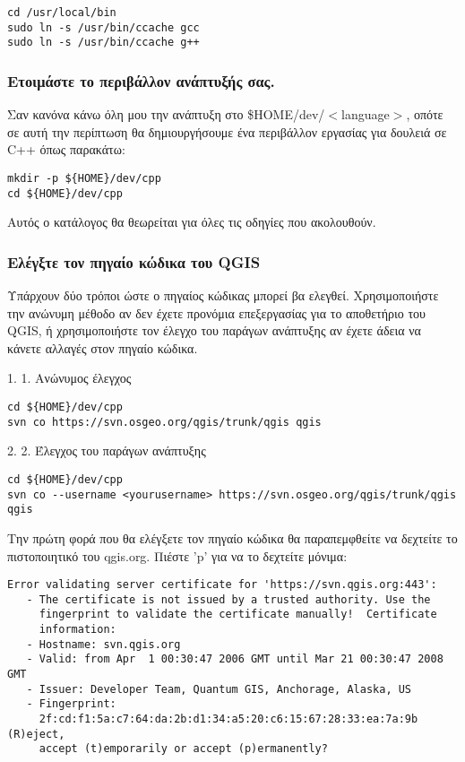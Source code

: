 \begin{verbatim}
cd /usr/local/bin 
sudo ln -s /usr/bin/ccache gcc 
sudo ln -s /usr/bin/ccache g++ 
\end{verbatim}

\hypertarget{toc8}{}
\subsubsection{Ετοιμάστε το περιβάλλον ανάπτυξής σας.}
Σαν κανόνα κάνω όλη μου την ανάπτυξη στο \$HOME/dev/$<$language$>$, οπότε σε αυτή την περίπτωση θα δημιουργήσουμε ένα περιβάλλον εργασίας για δουλειά σε C++ όπως παρακάτω: 

\begin{verbatim}
mkdir -p ${HOME}/dev/cpp 
cd ${HOME}/dev/cpp 
\end{verbatim}

Αυτός ο κατάλογος θα θεωρείται για όλες τις οδηγίες που ακολουθούν. 

\hypertarget{toc9}{}
\subsubsection{Ελέγξτε τον πηγαίο κώδικα του QGIS}
Υπάρχουν δύο τρόποι ώστε ο πηγαίος κώδικας μπορεί βα ελεγθεί. Χρησιμοποιήστε την ανώνυμη μέθοδο αν δεν έχετε προνόμια επεξεργασίας για το αποθετήριο του QGIS, ή χρησιμοποιήστε τον έλεγχο του παράγων ανάπτυξης αν έχετε άδεια να κάνετε αλλαγές στον πηγαίο κώδικα.

1. 1. Ανώνυμος έλεγχος

\begin{verbatim}
cd ${HOME}/dev/cpp 
svn co https://svn.osgeo.org/qgis/trunk/qgis qgis
\end{verbatim}

2. 2. Έλεγχος του παράγων ανάπτυξης

\begin{verbatim}
cd ${HOME}/dev/cpp 
svn co --username <yourusername> https://svn.osgeo.org/qgis/trunk/qgis qgis 
\end{verbatim}

Την πρώτη φορά που θα ελέγξετε τον πηγαίο κώδικα θα παραπεμφθείτε να δεχτείτε το πιστοποιητικό  του qgis.org. Πιέστε 'p' για να το δεχτείτε μόνιμα:

\begin{verbatim}
Error validating server certificate for 'https://svn.qgis.org:443':
   - The certificate is not issued by a trusted authority. Use the
     fingerprint to validate the certificate manually!  Certificate
     information:
   - Hostname: svn.qgis.org
   - Valid: from Apr  1 00:30:47 2006 GMT until Mar 21 00:30:47 2008 GMT
   - Issuer: Developer Team, Quantum GIS, Anchorage, Alaska, US
   - Fingerprint:
     2f:cd:f1:5a:c7:64:da:2b:d1:34:a5:20:c6:15:67:28:33:ea:7a:9b (R)eject,
     accept (t)emporarily or accept (p)ermanently?  
\end{verbatim}

